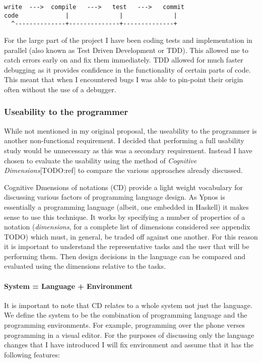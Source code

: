 \begin{verbatim}
write  --->  compile   --->   test   --->   commit
code             |              |              |
  ^--------------+--------------+--------------+
\end{verbatim}

For the large part of the project I have been coding tests and
implementation in parallel (also known as Test Driven Development or
TDD). This allowed me to catch errors early on and fix them immediately.
TDD allowed for much faster debugging as it provides confidence in the
functionality of certain parts of code. This meant that when I
encountered bugs I was able to pin-point their origin often without the
use of a debugger.

\subsubsection{Useability to the programmer}

While not mentioned in my original proposal, the useability to the
programmer is another non-functional requirement. I decided that
performing a full usability study would be unnecessary as this was a
secondary requirement. Instead I have chosen to evaluate the usability
using the method of \emph{Cognitive Dimensions}{[}TODO:ref{]} to compare
the various approaches already discussed.

Cognitive Dmensions of notations (CD) provide a light weight vocabulary
for discussing various factors of programming language design. As Ypnos
is essentially a programming language (albeit, one embedded in Haskell)
it makes sense to use this technique. It works by specifying a number of
properties of a notation (\emph{dimensions}, for a complete list of
dimensions considered see appendix TODO) which must, in general, be
traded off against one another. For this reason it is important to
understand the representative tasks and the user that will be performing
them. Then design decisions in the language can be compared and
evaluated using the dimensions relative to the tasks.

\paragraph{System = Language + Environment}

It is important to note that CD relates to a whole system not just the
language. We define the system to be the combination of programming
language and the programming environments. For example, programming over
the phone verses programming in a visual editor. For the purposes of
discussing only the language changes that I have introduced I will fix
environment and assume that it has the following features:


